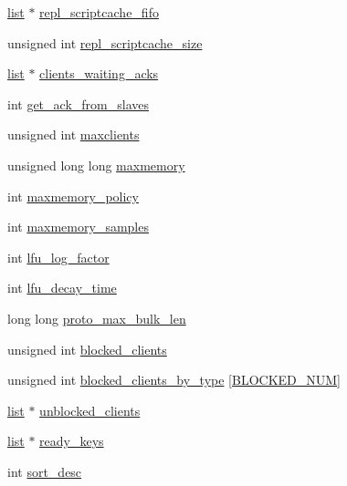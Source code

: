 \begin{DoxyCompactItemize}
\item 
\hyperlink{structlist}{list} $\ast$ \hyperlink{structredis_server_a61642879c8697309e0a0b1f8e27d79a0}{repl\+\_\+scriptcache\+\_\+fifo}
\item 
unsigned int \hyperlink{structredis_server_a55aa7d1ce933f80d06cbcbeef8d03601}{repl\+\_\+scriptcache\+\_\+size}
\item 
\hyperlink{structlist}{list} $\ast$ \hyperlink{structredis_server_a5f87bbf8bd892d1459c39ae55c19bdec}{clients\+\_\+waiting\+\_\+acks}
\item 
int \hyperlink{structredis_server_a07a4e0373efa220e37c571db92057029}{get\+\_\+ack\+\_\+from\+\_\+slaves}
\item 
unsigned int \hyperlink{structredis_server_a0773e5d1aebd4a30557321a36a1b8c57}{maxclients}
\item 
unsigned long long \hyperlink{structredis_server_a7f900ab67c16f474082be15af9380a78}{maxmemory}
\item 
int \hyperlink{structredis_server_a98440b0fba87820830ee90965c9f54f4}{maxmemory\+\_\+policy}
\item 
int \hyperlink{structredis_server_a7dfb65e4690d5e3ddf6689e030c624c4}{maxmemory\+\_\+samples}
\item 
int \hyperlink{structredis_server_a1a4fb70d4b90d928d032e1be232c4566}{lfu\+\_\+log\+\_\+factor}
\item 
int \hyperlink{structredis_server_a933413e654fa963feaa5c069387e825c}{lfu\+\_\+decay\+\_\+time}
\item 
long long \hyperlink{structredis_server_ad8b9c110356e88c74267accd345b669d}{proto\+\_\+max\+\_\+bulk\+\_\+len}
\item 
unsigned int \hyperlink{structredis_server_aa58813aba5328ff8194bcf2c2326dda7}{blocked\+\_\+clients}
\item 
unsigned int \hyperlink{structredis_server_a6f19e371db996c707abef6d06c6231c2}{blocked\+\_\+clients\+\_\+by\+\_\+type} \mbox{[}\hyperlink{server_8h_a7b2645977d2cac8f57f1b8b51048a3ef}{B\+L\+O\+C\+K\+E\+D\+\_\+\+N\+UM}\mbox{]}
\item 
\hyperlink{structlist}{list} $\ast$ \hyperlink{structredis_server_af1e6c692e015469af388bc1e9e1307ed}{unblocked\+\_\+clients}
\item 
\hyperlink{structlist}{list} $\ast$ \hyperlink{structredis_server_a7a707c2da0ace2b0eb8a278960c34f7a}{ready\+\_\+keys}
\item 
int \hyperlink{structredis_server_acd3679efc199ee2622e96ae80d379cfe}{sort\+\_\+desc}
\item 

\end{DoxyCompactItemize}
